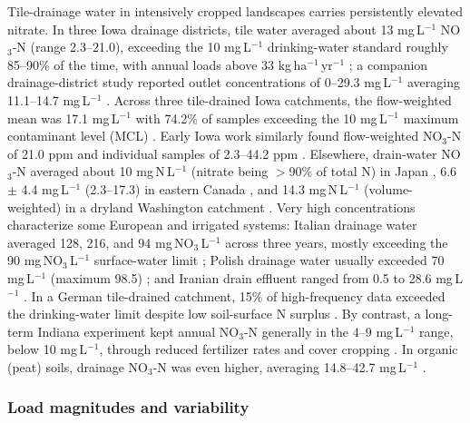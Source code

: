 Tile-drainage water in intensively cropped landscapes carries persistently elevated nitrate. In three Iowa drainage districts, tile water averaged about 13 mg\,L$^{-1}$ NO$_3$-N (range 2.3--21.0), exceeding the 10 mg\,L$^{-1}$ drinking-water standard roughly 85--90\% of the time, with annual loads above 33 kg\,ha$^{-1}$\,yr$^{-1}$ \parencite{Schilling2012b}; a companion drainage-district study reported outlet concentrations of 0--29.3 mg\,L$^{-1}$ averaging 11.1--14.7 mg\,L$^{-1}$ \parencite{Schilling2013}. Across three tile-drained Iowa catchments, the flow-weighted mean was 17.1 mg\,L$^{-1}$ with 74.2\% of samples exceeding the 10 mg\,L$^{-1}$ maximum contaminant level (MCL) \parencite{Ikenberry2014}. Early Iowa work similarly found flow-weighted NO$_3$-N of 21.0 ppm and individual samples of 2.3--44.2 ppm \parencite{BAKER1975}. Elsewhere, drain-water NO$_3$-N averaged about 10 mg\,N\,L$^{-1}$ (nitrate being $>$90\% of total N) in Japan \parencite{Hayashi1999}, 6.6 $\pm$ 4.4 mg\,L$^{-1}$ (2.3--17.3) in eastern Canada \parencite{Smith2011}, and 14.3 mg\,N\,L$^{-1}$ (volume-weighted) in a dryland Washington catchment \parencite{Kelley2017}. Very high concentrations characterize some European and irrigated systems: Italian drainage water averaged 128, 216, and 94 mg\,NO$_3$\,L$^{-1}$ across three years, mostly exceeding the 90 mg\,NO$_3$\,L$^{-1}$ surface-water limit \parencite{ROSSI1991}; Polish drainage water usually exceeded 70 mg\,L$^{-1}$ (maximum 98.5) \parencite{Dragon2016}; and Iranian drain effluent ranged from 0.5 to 28.6 mg\,L$^{-1}$ \parencite{DarziNaftchali2017}. In a German tile-drained catchment, 15\% of high-frequency data exceeded the drinking-water limit despite low soil-surface N surplus \parencite{Bauwe2020}. By contrast, a long-term Indiana experiment kept annual NO$_3$-N generally in the 4--9 mg\,L$^{-1}$ range, below 10 mg\,L$^{-1}$, through reduced fertilizer rates and cover cropping \parencite{Kladivko2021,Kladivko2004}. In organic (peat) soils, drainage NO$_3$-N was even higher, averaging 14.8--42.7 mg\,L$^{-1}$ \parencite{MILLER1979}.

\subsubsection{Load magnitudes and variability}


